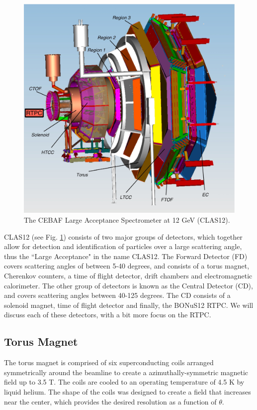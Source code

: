 \begin{figure}[h!]
	\centering
	\includegraphics[width=0.8\linewidth]{figures/clas12.png}
	\caption{The CEBAF Large Acceptance Spectrometer at 12 GeV (CLAS12).}
	\label{fig:clas12}
\end{figure}

CLAS12 (see Fig. \ref{fig:clas12}) consists of two major groups of detectors, which together allow for detection and identification of particles over a large scattering angle, thus the ``Large Acceptance" in the name CLAS12. The Forward Detector (FD) covers scattering angles of between 5-40 degrees, and consists of a torus magnet, Cherenkov counters, a time of flight detector, drift chambers and electromagnetic calorimeter. The other group of detectors is known as the Central Detector (CD), and covers scattering angles between 40-125 degrees. The CD consists of a solenoid magnet, time of flight detector and finally, the BONuS12 RTPC. We will discuss each of these detectors, with a bit more focus on the RTPC.

\subsection{Torus Magnet}
The torus magnet is comprised of six superconducting coils arranged symmetrically around the beamline to create a azimuthally-symmetric magnetic field up to 3.5 T. The coils are cooled to an operating temperature of 4.5 K by liquid helium. The shape of the coils was designed to create a field that increases near the center, which provides the desired resolution as a function of $\theta$.

